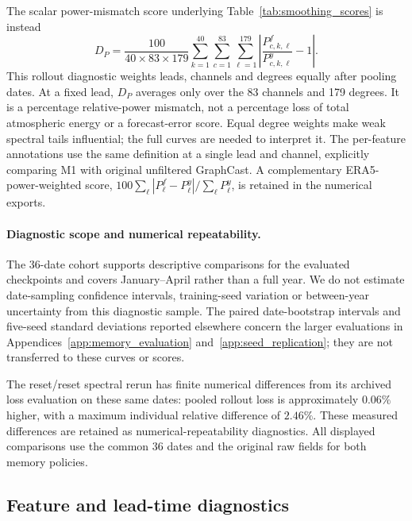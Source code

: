 \documentclass{article}
\newcommand{\vfourred}[1]{{\color{red}#1}}
\begin{document}
\vfourred{The scalar power-mismatch score underlying Table~\ref{tab:smoothing_scores} is instead}
\vfourred{\begin{equation}
D_P=\frac{100}{40\times83\times179}
       \sum_{k=1}^{40}\sum_{c=1}^{83}\sum_{\ell=1}^{179}
       \left|\frac{P^f_{c,k,\ell}}{P^y_{c,k,\ell}}-1\right|.
\label{eq:relative_power_mismatch}
\end{equation}}
\vfourred{This rollout diagnostic weights leads, channels and degrees equally after pooling dates. At a fixed lead, $D_P$ averages only over the 83 channels and 179 degrees. It is a percentage relative-power mismatch, not a percentage loss of total atmospheric energy or a forecast-error score. Equal degree weights make weak spectral tails influential; the full curves are needed to interpret it. The per-feature annotations use the same definition at a single lead and channel, explicitly comparing M1 with original unfiltered GraphCast. A complementary ERA5-power-weighted score, $100\sum_\ell|P^f_\ell-P^y_\ell|/\sum_\ell P^y_\ell$, is retained in the numerical exports.}



\paragraph{\vfourred{Diagnostic scope and numerical repeatability.}}
\vfourred{The 36-date cohort supports descriptive comparisons for the evaluated checkpoints and covers January--April rather than a full year. We do not estimate date-sampling confidence intervals, training-seed variation or between-year uncertainty from this diagnostic sample. The paired date-bootstrap intervals and five-seed standard deviations reported elsewhere concern the larger evaluations in Appendices~\ref{app:memory_evaluation} and~\ref{app:seed_replication}; they are not transferred to these curves or scores.}

\vfourred{The reset/reset spectral rerun has finite numerical differences from its archived loss evaluation on these same dates: pooled rollout loss is approximately $0.06\%$ higher, with a maximum individual relative difference of $2.46\%$. These measured differences are retained as numerical-repeatability diagnostics. All displayed comparisons use the common 36 dates and the original raw fields for both memory policies.}

\subsection{\vfourred{Feature and lead-time diagnostics}}
\label{app:smoothing_features}
\end{document}
